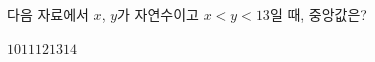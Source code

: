 다음 자료에서 $x$, $y$가 자연수이고 $x<y<13$일 때, 중앙값은? 
\begin{choices32}{$10$}{$11$}{$12$}{$13$}{$14$}\end{choices32}
